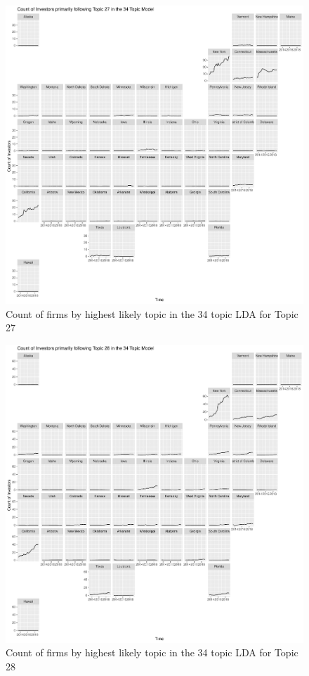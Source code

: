 \begin{figure}
	\centering
	\includegraphics[width=1\linewidth]{Figures/ChapterV/USA_34_Topic27.pdf}
	\caption[Count of firm for Topic 27 by quarter]{Count of firms by highest likely topic in the 34 topic LDA for Topic 27}
	\label{fig:StateLDA27}
\end{figure}

\begin{figure}
	\centering
	\includegraphics[width=1\linewidth]{Figures/ChapterV/USA_34_Topic28.pdf}
	\caption[Count of firm for Topic 28 by quarter]{Count of firms by highest likely topic in the 34 topic LDA for Topic 28}
	\label{fig:StateLDA28}
\end{figure}


